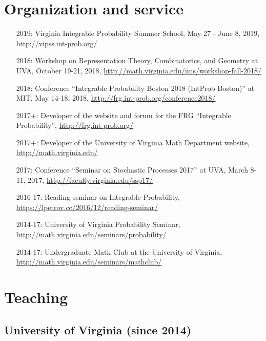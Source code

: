 \documentclass[letterpaper,11pt]{article}
\begin{document}
\section*{Organization and service}

\begin{itemize}
	\item [2019:]
		Virginia Integrable Probability Summer School,
		May 27 - June 8, 2019,
		\url{http://vipss.int-prob.org/}

	\item [2018:]
		Workshop on Representation Theory, Combinatorics, and Geometry
		at UVA,
		October 19-21, 2018,
		\url{http://math.virginia.edu/ims/workshop-fall-2018/}

	\item [2018:]
		Conference 
		``Integrable Probability Boston 2018 (IntProb Boston)''
		at MIT,
		May 14-18, 2018,
		\url{http://frg.int-prob.org/conference2018/}

	\item [2017+:]
		Developer of the website and forum for the FRG ``Integrable Probability'',
		\url{http://frg.int-prob.org/}

	\item [2017+:]
		Developer of the University of Virginia Math Department website,
		\url{http://math.virginia.edu/}
	\item
	      [2017:] Conference
	      ``Seminar on Stochastic Processes 2017'' at UVA,
				March 8-11, 2017,
	      \url{http://faculty.virginia.edu/ssp17/}
	\item
	      [2016-17:]
				Reading seminar on Integrable Probability,
	      \url{https://lpetrov.cc/2016/12/reading-seminar/}
	\item
			[2014-17:] University of Virginia Probability Seminar,
	      \url{http://math.virginia.edu/seminars/probability/}
	\item
	      [2014-17:]
				Undergraduate Math Club at the University of Virginia,
	      \url{http://math.virginia.edu/seminars/mathclub/}
\end{itemize}

\section*{Teaching}

\subsection*{University of Virginia (since 2014)}
\end{document}
